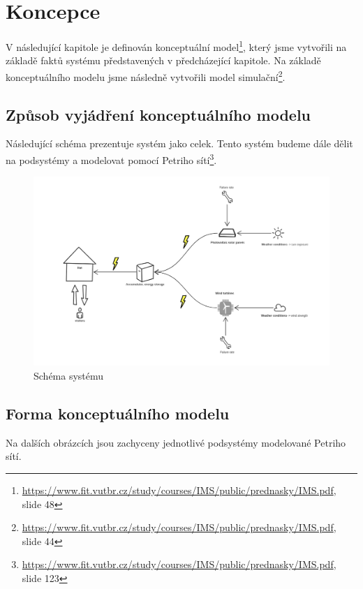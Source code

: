 \section{Koncepce}

V následující kapitole je definován konceptuální model\footnote{\url{https://www.fit.vutbr.cz/study/courses/IMS/public/prednasky/IMS.pdf}, slide 48}, který jsme vytvořili na základě faktů systému představených v předcházející kapitole. Na základě konceptuálního modelu jsme následně vytvořili model simulační\footnote{\url{https://www.fit.vutbr.cz/study/courses/IMS/public/prednasky/IMS.pdf}, slide 44}.



\subsection{Způsob vyjádření konceptuálního modelu}

Následující schéma prezentuje systém jako celek. Tento systém budeme dále dělit na podsystémy a modelovat pomocí Petriho sítí\footnote{\url{https://www.fit.vutbr.cz/study/courses/IMS/public/prednasky/IMS.pdf}, slide 123}.

\begin{figure}[H]
    \centering
    \includegraphics[width=.99\textwidth]{images/schema.png}\hfill
    \caption{Schéma systému}
    \label{fig:schema}
\end{figure}



\subsection{Forma konceptuálního modelu}

Na dalších obrázcích jsou zachyceny jednotlivé podsystémy modelované Petriho sítí.

